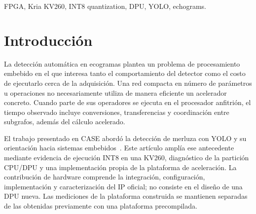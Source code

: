 \documentclass[10pt,conference,a4paper]{elektron}
\begin{document}
\begin{abstract}
This work presents an INT8 YOLO deployment flow on AMD Kria KV260 and characterizes a custom platform integrating the DPUCZDX8G v4.1 B4096 IP. On the historical platform, YOLOv8n required 57 DPU and 70 CPU subgraphs, whereas YOLOv7-tiny required one DPU subgraph and three CPU conversions. Despite its larger convolutional MAC count, YOLOv7-tiny achieved a mean pipeline latency of 459.138 ms versus 3544.368 ms. The custom platform was implemented with Vivado/Vitis 2022.2, enabled URAM and LeakyReLU, and met timing with a 0.006 ns WNS at requested clocks of 300/600 MHz. After compilation for the new fingerprint, hardware outputs exactly matched retained INT8 simulation outputs across nine tensors from three echograms. Mean pipeline and DPU hardware latencies were 460.139 ms and 42.196 ms, respectively. Measured VCC\_SOM power averaged 5.721 W, with an approximate total energy of 2.634 J per image measured on that rail, excluding the full carrier board and AC mains supply. On the evaluated deployment, convolutional MAC count alone did not predict end-to-end latency. Although YOLOv7-tiny required more MACs and slightly longer DPU execution, its graph mapped to a single DPU subgraph, avoiding the substantial CPU execution cost and numerous transitions observed for YOLOv8n. These results are specific to the evaluated flow; the small dataset lacks an independent test set, and functional agreement is restricted to the retained inputs.
\end{abstract}
\renewcommand{\IEEEkeywordsname}{Keywords}
\begin{IEEEkeywords}FPGA, Kria KV260, INT8 quantization, DPU, YOLO, echograms.\end{IEEEkeywords}

\section{Introducción}
La detección automática en ecogramas plantea un problema de procesamiento embebido en el que interesa tanto el comportamiento del detector como el costo de ejecutarlo cerca de la adquisición. Una red compacta en número de parámetros u operaciones no necesariamente utiliza de manera eficiente un acelerador concreto. Cuando parte de sus operadores se ejecuta en el procesador anfitrión, el tiempo observado incluye conversiones, transferencias y coordinación entre subgrafos, además del cálculo acelerado.

El trabajo presentado en CASE abordó la detección de merluza con YOLO y su orientación hacia sistemas embebidos~\cite{mozo2026case}. Este artículo amplía ese antecedente mediante evidencia de ejecución INT8 en una KV260, diagnóstico de la partición CPU/DPU y una implementación propia de la plataforma de aceleración. La contribución de hardware comprende la integración, configuración, implementación y caracterización del IP oficial; no consiste en el diseño de una DPU nueva. Las mediciones de la plataforma construida se mantienen separadas de las obtenidas previamente con una plataforma precompilada.
\end{document}
